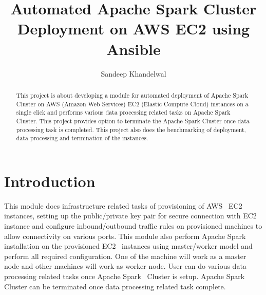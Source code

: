 
\title{Automated Apache Spark Cluster Deployment on AWS EC2 using Ansible}


\author{Sandeep Khandelwal}



\renewcommand{\shortauthors}{Sandeep}


\begin{abstract}

This project is about developing a module for automated deployment of
Apache Spark Cluster on AWS (Amazon Web Services) EC2 (Elastic Compute
Cloud) instances on a single click and performs various data processing
related tasks on Apache Spark Cluster. This project provides option to
terminate the Apache Spark Cluster once data processing task is
completed. This project also does the benchmarking of deployment, data
processing and termination of the instances.

\end{abstract}



\maketitle

\section{Introduction}

This module does infrastructure related tasks of provisioning of
AWS~\cite{hid-sp18-511-www-aws} EC2~\cite{hid-sp18-511-www-ec2}
instances, setting up the public/private key pair for secure
connection with EC2~\cite{hid-sp18-511-www-ec2} instance and configure
inbound/outbound traffic rules on provisioned machines to allow
connectivity on various ports. This module also perform Apache
Spark~\cite{hid-sp18-511-www-spark} installation on the provisioned
EC2~\cite{hid-sp18-511-www-ec2} instances using master/worker model
and perform all required configuration. One of the machine will work
as a master node and other machines will work as worker node. User can
do various data processing related tasks once Apache
Spark~\cite{hid-sp18-511-www-spark} Cluster is setup. Apache
Spark~\cite{hid-sp18-511-www-spark} Cluster can be terminated once
data processing related task complete.

